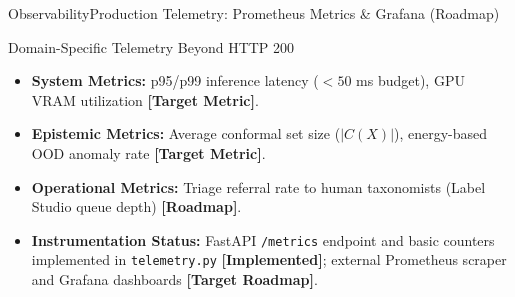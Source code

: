 \begin{frame}{Observability}{Production Telemetry: Prometheus Metrics \& Grafana (Roadmap)}
    \begin{block}{Domain-Specific Telemetry Beyond HTTP 200}
        \begin{itemize}\small
            \item \textbf{System Metrics:} p95/p99 inference latency ($<50$ ms budget), GPU VRAM utilization \textcolor{signalorange}{\textbf{[Target Metric]}}.
            \item \textbf{Epistemic Metrics:} Average conformal set size ($|C(X)|$), energy-based OOD anomaly rate \textcolor{signalorange}{\textbf{[Target Metric]}}.
            \item \textbf{Operational Metrics:} Triage referral rate to human taxonomists (Label Studio queue depth) \textcolor{deepblue}{\textbf{[Roadmap]}}.
            \item \textbf{Instrumentation Status:} FastAPI \texttt{/metrics} endpoint and basic counters implemented in \texttt{telemetry.py} \textcolor{plantgreen}{\textbf{[Implemented]}}; external Prometheus scraper and Grafana dashboards \textcolor{deepblue}{\textbf{[Target Roadmap]}}.
        \end{itemize}
    \end{block}

    \vspace{0.15cm}
    \statustarget

\end{frame}

